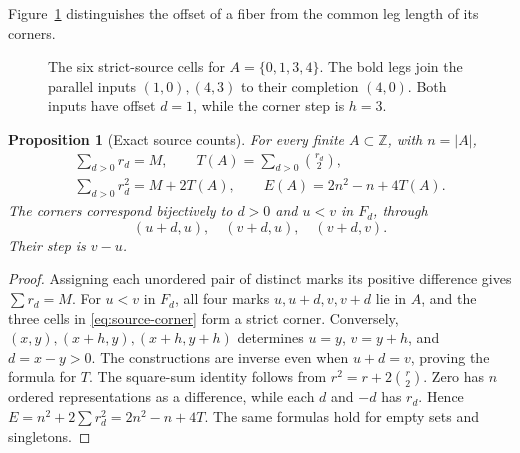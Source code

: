 \documentclass[11pt,a4paper]{article}
\newif\ifshowrevisions
\newcommand{\rev}[1]{{\ifshowrevisions\color{red}\fi #1}}
\newenvironment{revision}{\par\begingroup\ifshowrevisions\color{red}\fi}{\par\endgroup}
\newtheorem{proposition}[theorem]{Proposition}
\theoremstyle{definition}
\newcommand{\Z}{\mathbb Z}
\numberwithin{equation}{section}
\begin{document}
\begin{revision}
Figure~\ref{fig:source-offset-step} distinguishes the offset of a fiber from the common leg length of its corners.
\begin{figure}[!htbp]
\centering
{}
\caption{\rev{The six strict-source cells for $A=\{0,1,3,4\}$. The bold legs join the parallel inputs $(1,0),(4,3)$ to their completion $(4,0)$. Both inputs have offset $d=1$, while the corner step is $h=3$.}}
\label{fig:source-offset-step}
\end{figure}
\end{revision}

\begin{proposition}[Exact source counts]\label{prop:counts}
For every finite $A\subset\Z$, with $n=|A|$,
\begin{equation}\label{eq:source-counts}
\begin{gathered}
\sum_{d>0}r_d=M,\qquad
T(A)=\sum_{d>0}\binom{r_d}{2},\\
\sum_{d>0}r_d^2=M+2T(A),\qquad
E(A)=2n^2-n+4T(A).
\end{gathered}
\end{equation}
The corners correspond bijectively to $d>0$ and $u<v$ in $F_d$, through
\begin{equation}\label{eq:source-corner}
(u+d,u),\quad(v+d,u),\quad(v+d,v).
\end{equation}
Their step is $v-u$.
\end{proposition}
\begin{proof}
Assigning each unordered pair of distinct marks its positive difference
gives $\sum r_d=M$. For $u<v$ in $F_d$, all four marks
$u,u+d,v,v+d$ lie in $A$, and the three cells in
\eqref{eq:source-corner} form a strict corner. Conversely,
$(x,y),(x+h,y),(x+h,y+h)$ determines
$u=y$, $v=y+h$, and $d=x-y>0$. The constructions are inverse
even when $u+d=v$, proving the formula for $T$.
The square-sum identity follows from $r^2=r+2\binom r2$.
Zero has $n$ ordered representations as a difference, while each
$d$ and $-d$ has $r_d$. Hence
$E=n^2+2\sum r_d^2=2n^2-n+4T$.
The same formulas hold for empty sets and singletons.
\end{proof}
\end{document}
